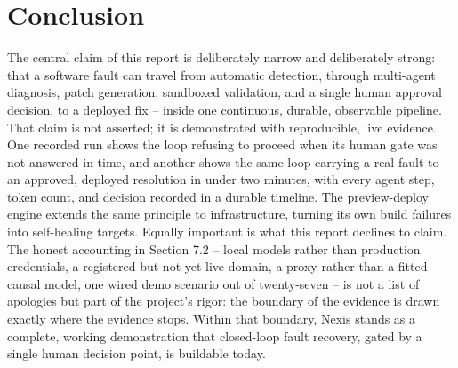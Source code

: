 \section{Conclusion}

The central claim of this report is deliberately narrow and deliberately
strong: that a software fault can travel from automatic detection, through
multi-agent diagnosis, patch generation, sandboxed validation, and a single
human approval decision, to a deployed fix -- inside one continuous,
durable, observable pipeline. That claim is not asserted; it is demonstrated
with reproducible, live evidence. One recorded run shows the loop refusing
to proceed when its human gate was not answered in time, and another shows
the same loop carrying a real fault to an approved, deployed resolution in
under two minutes, with every agent step, token count, and decision recorded
in a durable timeline. The preview-deploy engine extends the same principle
to infrastructure, turning its own build failures into self-healing targets.
Equally important is what this report declines to claim. The honest
accounting in Section 7.2 -- local models rather than production
credentials, a registered but not yet live domain, a proxy rather than a
fitted causal model, one wired demo scenario out of twenty-seven -- is not a
list of apologies but part of the project's rigor: the boundary of the
evidence is drawn exactly where the evidence stops. Within that boundary,
Nexis stands as a complete, working demonstration that closed-loop fault
recovery, gated by a single human decision point, is buildable today.
